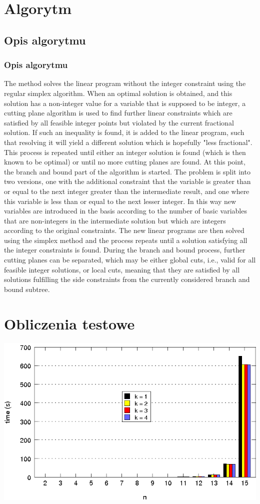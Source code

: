 \documentclass{beamer}
\begin{document}
\section{Algorytm}
\subsection{Opis algorytmu}
\begin{frame}
\frametitle{Opis algorytmu}
The method solves the linear program without the integer constraint using the regular simplex algorithm. When an optimal solution is obtained, and this solution has a non-integer value for a variable that is supposed to be integer, a cutting plane algorithm is used to find further linear constraints which are satisfied by all feasible integer points but violated by the current fractional solution. If such an inequality is found, it is added to the linear program, such that resolving it will yield a different solution which is hopefully "less fractional". This process is repeated until either an integer solution is found (which is then known to be optimal) or until no more cutting planes are found.
At this point, the branch and bound part of the algorithm is started. The problem is split into two versions, one with the additional constraint that the variable is greater than or equal to the next integer greater than the intermediate result, and one where this variable is less than or equal to the next lesser integer. In this way new variables are introduced in the basis according to the number of basic variables that are non-integers in the intermediate solution but which are integers according to the original constraints. The new linear programs are then solved using the simplex method and the process repeats until a solution satisfying all the integer constraints is found. During the branch and bound process, further cutting planes can be separated, which may be either global cuts, i.e., valid for all feasible integer solutions, or local cuts, meaning that they are satisfied by all solutions fulfilling the side constraints from the currently considered branch and bound subtree.
\end{frame}

\section{Obliczenia testowe}
\begin{frame}
\includegraphics[scale=0.4]{times.png}
\end{frame}
\end{document}
